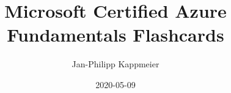 \documentclass{scrartcl}
\begin{document}
    \title{Microsoft Certified Azure Fundamentals Flashcards}
    \date{2020-05-09}
    \author{Jan-Philipp Kappmeier}

    \clearpage\maketitle
    \thispagestyle{empty}
    \pagebreak

    \doclicenseThis
    \pagebreak
\end{document}
